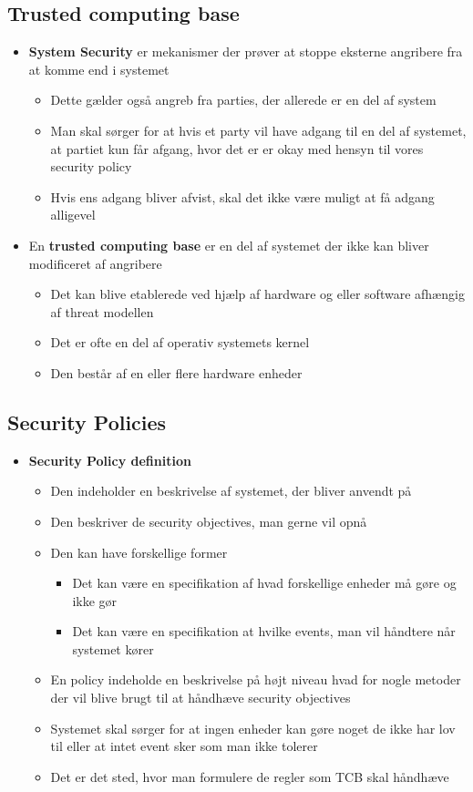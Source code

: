 \documentclass[a4, english]{article}
\begin{document}
\subsection{Trusted computing base}
\begin{itemize}
	\item \textbf{System Security} er mekanismer der prøver at stoppe eksterne angribere fra at komme end i systemet 
  \begin{itemize}
  	\item Dette gælder også angreb fra parties, der allerede er en del af system
    \item Man skal sørger for at hvis et party vil have adgang til en del af systemet, at partiet kun får afgang, hvor det er er okay med hensyn til vores security policy 
    \item Hvis ens adgang bliver afvist, skal det ikke være muligt at få adgang alligevel
  \end{itemize}
  \item En \textbf{trusted computing base} er en del af systemet der ikke kan bliver modificeret af angribere 
  \begin{itemize}
  	\item Det kan blive etablerede ved hjælp af hardware og eller software afhængig af threat modellen    
    \item Det er ofte en del af operativ systemets kernel
    \item Den består af en eller flere hardware enheder 
  \end{itemize}
\end{itemize}

\subsection{Security Policies}
\begin{itemize}
	\item \textbf{Security Policy definition}
  \begin{itemize}
    \item Den indeholder en beskrivelse af systemet, der bliver anvendt på 
  	\item Den beskriver de security objectives, man gerne vil opnå 
    \item Den kan have forskellige former
    \begin{itemize}
    	\item Det kan være en specifikation af hvad forskellige enheder må gøre og ikke gør
      \item Det kan være en specifikation at hvilke events, man vil håndtere når systemet kører  
    \end{itemize}
    \item En policy indeholde en beskrivelse på højt niveau hvad for nogle metoder der vil blive brugt til at håndhæve security objectives 
    \item Systemet skal sørger for at ingen enheder kan gøre noget de ikke har lov til eller at intet event sker som man ikke tolerer 
    \item Det er det sted, hvor man formulere de regler som TCB skal håndhæve 
  \end{itemize}
\end{itemize}
\end{document}
